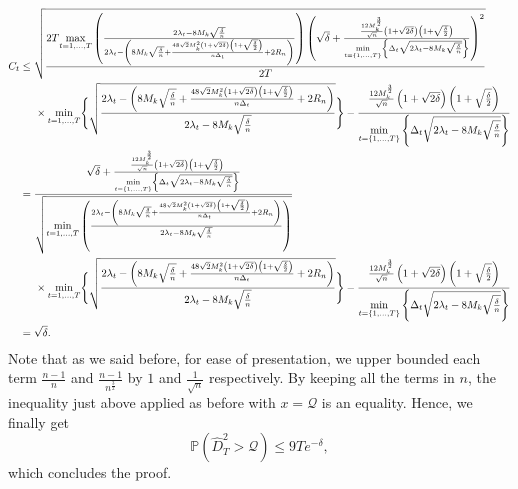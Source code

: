 \documentclass[twoside,11pt]{article}
\newcommand{\nb}{n}
\newcommand{\PPO}{\mathbb{P} }
\newcommand{\qmaj}{\mathcal{Q}}
\begin{document}
\begin{align}
    C_t &\leq \sqrt{\frac{2 T \underset{t=1,\ldots,T}{\max}  \left( \frac{2\lambda_t - 8 M_k \sqrt{\frac{\delta}{\nb}}}{2\lambda_t - \left( 8 M_k \sqrt{\frac{\delta}{\nb}} + \frac{48 \sqrt{2} M_k^2 \left(1+ \sqrt{2\delta}\right) \left(1+ \sqrt{\frac{\delta}{2}}\right)}{\nb \Delta_t} + 2 R_{\nb} \right)}\right)  \left(\sqrt{\delta} + \frac{\frac{12 M_k^{\frac{3}{2}}}{\sqrt{\nb}} \left(1+ \sqrt{2\delta}\right) \left(1+ \sqrt{\frac{\delta}{2}}\right)}{ \underset{t=\{1,\ldots,T\}}{\min} \left\{\Delta_t \sqrt{2\lambda_t - 8 M_k \sqrt{\frac{\delta}{\nb}}} \right\}} \right)^2}{2T}} \notag \\
    & \hspace{0.5 cm} \times \underset{t=1,\ldots,T}{\min} \Bigg\{ \sqrt{\frac{2\lambda_t - \left( 8 M_k \sqrt{\frac{\delta}{\nb}} + \frac{48 \sqrt{2} M_k^2 \left(1+ \sqrt{2\delta}\right) \left(1+ \sqrt{\frac{\delta}{2}}\right)}{\nb \Delta_t} + 2 R_{\nb} \right)}{2\lambda_t - 8 M_k \sqrt{\frac{\delta}{\nb}}}}\Bigg\} - \frac{\frac{12 M_k^{\frac{3}{2}}}{\sqrt{\nb}} \left(1+ \sqrt{2\delta}\right) \left(1+ \sqrt{\frac{\delta}{2}}\right)}{\underset{t=\{1,\ldots,T\}}{\min} \left\{\Delta_t \sqrt{2\lambda_t - 8 M_k \sqrt{\frac{\delta}{\nb}}} \right\}} \notag \\
    &= \frac{\sqrt{\delta} + \frac{\frac{12 M_k^{\frac{3}{2}}}{\sqrt{\nb}} \left(1+ \sqrt{2\delta}\right) \left(1+ \sqrt{\frac{\delta}{2}}\right)}{ \underset{t=\{1,\ldots,T\}}{\min} \left\{\Delta_t \sqrt{2\lambda_t - 8 M_k \sqrt{\frac{\delta}{\nb}}} \right\}}
    }{\sqrt{\underset{t=1,\ldots,T}{\min}  \left( \frac{2\lambda_t - \left( 8 M_k \sqrt{\frac{\delta}{\nb}} + \frac{48 \sqrt{2} M_k^2 \left(1+ \sqrt{2\delta}\right) \left(1+ \sqrt{\frac{\delta}{2}}\right)}{\nb \Delta_t} + 2 R_{\nb}  \right)}{2\lambda_t - 8 M_k \sqrt{\frac{\delta}{\nb}}}  \right)}}   \notag \\
    & \hspace{0.5 cm} \times \underset{t=1,\ldots,T}{\min} \Bigg\{ \sqrt{\frac{2\lambda_t - \left( 8 M_k \sqrt{\frac{\delta}{\nb}} + \frac{48 \sqrt{2} M_k^2 \left(1+ \sqrt{2\delta}\right) \left(1+ \sqrt{\frac{\delta}{2}}\right)}{\nb \Delta_t} + 2 R_{\nb} \right)}{2\lambda_t - 8 M_k \sqrt{\frac{\delta}{\nb}}}}\Bigg\} - \frac{\frac{12 M_k^{\frac{3}{2}}}{\sqrt{\nb}} \left(1+ \sqrt{2\delta}\right) \left(1+ \sqrt{\frac{\delta}{2}}\right)}{\underset{t=\{1,\ldots,T\}}{\min} \left\{\Delta_t \sqrt{2\lambda_t - 8 M_k \sqrt{\frac{\delta}{\nb}}} \right\}} \notag \\
    &= \sqrt{\delta}\notag .
\end{align}
Note that as we said before, for ease of presentation, we upper bounded each term $\frac{\nb-1}{\nb}$ and $\frac{\nb-1}{\nb^{\frac{3}{2}}}$ by $1$ and $\frac{1}{\sqrt{\nb}}$ respectively. By keeping all the terms in $\nb$, the inequality just above applied as before with  $x = \qmaj$ is an equality. 
Hence, we finally get $$ \PPO \left(\widehat{D}^2_T >   \qmaj \right) \leq 9 T e^{-\delta},$$
which concludes the proof. 
\end{document}

